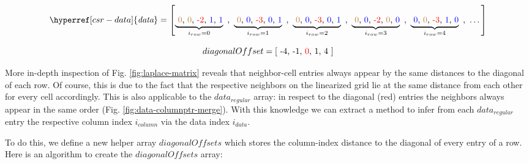 \begin{figure*}
\centering
\[
	\hyperref[csr-data]{\textit{data}} = \left[ 
	\underbrace{\text{ \textcolor{brown}{0}, \textcolor{brown}{0}, \textcolor{red}{-2}, \textcolor{blue}{1}, \textcolor{blue}{1}}}_{i_{row} = 0} \text{ , }
	\underbrace{\text{ \textcolor{brown}{0}, \textcolor{blue}{0}, \textcolor{red}{-3}, \textcolor{blue}{0}, \textcolor{blue}{1}}}_{i_{row} = 1} \text{ , }
	\underbrace{\text{ \textcolor{brown}{0}, \textcolor{blue}{0}, \textcolor{red}{-3}, \textcolor{blue}{0}, \textcolor{blue}{1}}}_{i_{row} = 2} \text{ , }
	\underbrace{\text{ \textcolor{brown}{0}, \textcolor{blue}{0}, \textcolor{red}{-2}, \textcolor{brown}{0}, \textcolor{blue}{0}}}_{i_{row} = 3} \text{ , }
	\underbrace{\text{ \textcolor{blue}{0}, \textcolor{brown}{0}, \textcolor{red}{-3}, \textcolor{blue}{1}, \textcolor{blue}{0}}}_{i_{row} = 4} \text{ , }
	\dots
	\right]
\]
\caption{Vizualization of $data_{regular}$ array for Fig. \ref{fig:laplace-matrix}. Diagonal entries are printed in red. Neighbor cells are printed in blue if they are within the grid and brown otherwise.
}
\label{fig:data-columnptr-merge}
\end{figure*} 
\begin{figure*}
\centering
\[
	diagonalOffset = \left[ \text{ -4, -1, \textcolor{red}{0}, 1, 4 } \right]
\]
\caption{$diagonalOffset$ array that corresponds to Fig. \ref{fig:laplace-matrix}.}
\label{fig:data-columnptr-merge}
\end{figure*} 
More in-depth inspection of Fig. \ref{fig:laplace-matrix} reveals that neighbor-cell entries always appear by the same distances to the diagonal of each row. Of course, this is due to the fact that the respective neighbors on the linearized grid lie at the same distance from each other for every cell accordingly. This is also applicable to the $data_{regular}$ array: in respect to the diagonal (red) entries the neighbors always appear in the same order (Fig. \ref{fig:data-columnptr-merge}). With this knowledge we can extract a method to infer from each $data_{regular}$ entry the respective column index $i_{column}$ via the data index $i_{data}$. 
\par To do this, we define a new helper array $diagonalOffsets$ which stores the column-index distance to the diagonal of every entry of a row.
Here is an algorithm to create the $diagonalOffsets$ array:

